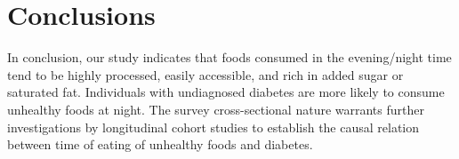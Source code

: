 \documentclass{bmcart}
\begin{document}
\section*{Conclusions}
In conclusion, our study indicates that foods consumed in the evening/night time tend to be highly processed, easily accessible, and rich in added sugar or saturated fat. Individuals with undiagnosed diabetes are more likely to consume unhealthy foods at night. The survey cross-sectional nature warrants further investigations by longitudinal cohort studies to establish the causal relation between time of eating of unhealthy foods and diabetes.

%
%
%
%
\end{document}
